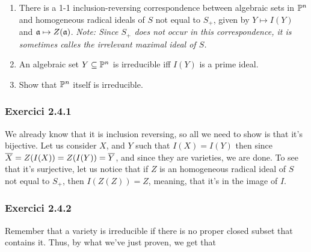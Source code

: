 \documentclass[11pt, a4paper]{article}
\begin{document}
\newpage
\begin{tcolorbox}[title=\subsection{Exercici 2.4}]
    \begin{enumerate}
        \item There is a 1-1 inclusion-reversing correspondence between algebraic sets in $\mathbb P^n$ and homogeneous radical ideals of $S$ not equal to $S_+$, given by $Y\mapsto I(Y)$ and $\mathfrak a\mapsto Z(\mathfrak a)$. \textit{Note: Since $S_+$ does not occur in this correspondence, it is sometimes calles the irrelevant maximal ideal of $S$.}
        \item An algebraic set $Y\subseteq \mathbb P^n$ is irreducible iff $I(Y)$ is a prime ideal.
        \item Show that $\mathbb P^n$ itself is irreducible.
    \end{enumerate}
\end{tcolorbox}
\subsubsection{Exercici 2.4.1}
We already know that it is inclusion reversing, so all we need to show is that it's bijective. Let us consider $X$, and $Y$ such that $I(X)=I(Y)$ then since $\overline X=Z(I(X))=Z(I(Y))=\overline Y$, and since they are varieties, we are done. To see that it's surjective, let us notice that if $Z$ is an homogeneous radical ideal of $S$ not equal to $S_+$, then $I(Z(Z))=Z$, meaning, that it's in the image of $I$.
\subsubsection{Exercici 2.4.2}
Remember that a variety is irreducible if there is no proper closed subset that contains it. Thus, by what we've just proven, we get that 
\end{document}
